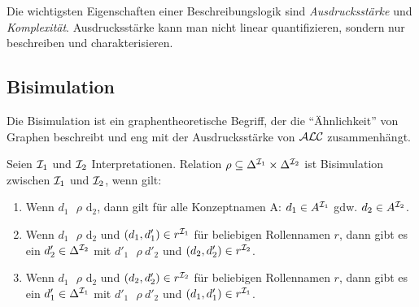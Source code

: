 Die wichtigsten Eigenschaften einer Beschreibungslogik sind
\emph{Ausdrucksstärke} und \emph{Komplexität}. Ausdrucksstärke kann man nicht
linear quantifizieren, sondern nur beschreiben und charakterisieren.

\subsection{Bisimulation}\label{bisimulation}

Die Bisimulation ist ein graphentheoretische Begriff, der die \enquote{Ähnlichkeit} von Graphen beschreibt und eng mit der Ausdrucksstärke von $\mathcal{A}\mathcal{L}\mathcal{C}$ zusammenhängt.

\begin{definition}[Bisimulation]

Seien $\mathcal{I}_1$ und $\mathcal{I}_2$ Interpretationen. Relation
$\rho \subseteq \Delta^{\mathcal{I}_1} \times \Delta^{\mathcal{I}_2}$ ist Bisimulation
zwischen $\mathcal{I}_1$ und $\mathcal{I}_2$, wenn gilt:

\begin{enumerate}
\def\labelenumi{\arabic{enumi}.}
\item
  Wenn $d_1\text{\ $\rho$}\text{\ d}_2$, dann gilt für alle
  Konzeptnamen A: $d_1 \in A^{\mathcal{I}_1}$ gdw. $d_2 \in A^{\mathcal{I}_2}$.
\item
  Wenn $d_1\text{\ $\rho$}\text{\ d}_2$ und
  $\left( d_1,d_1' \right) \in r^{\MI_1}$ für beliebigen
  Rollennamen $r$, dann gibt es ein $d_2' \in \Delta^{\mathcal{I}_2}$
  mit ${d'}_1\text{\ $\rho$}{\ d'}_2$ und
  $\left( d_2,d_2' \right) \in r^{\MI_2}$.
\item
  Wenn $d_1\text{\ $\rho$}\text{\ d}_2$ und
  $\left( d_2,d_2' \right) \in r^{\MI_2}$ für beliebigen
  Rollennamen $r$, dann gibt es ein $d_1' \in \Delta^{\mathcal{I}_1}$
  mit ${d'}_1\text{\ $\rho$}{\ d'}_2$ und
  $\left( d_1,d_1' \right) \in r^{\MI_1}$.
\end{enumerate}
\end{definition}

